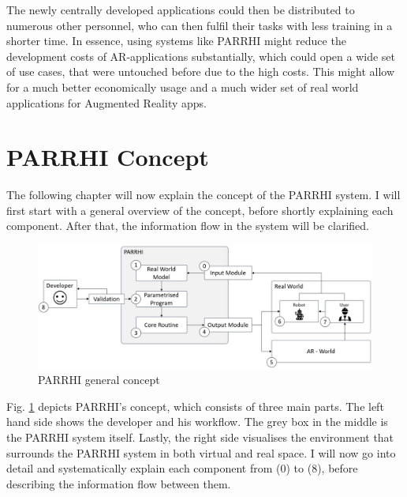 The newly centrally developed applications could then be distributed to numerous other personnel, who can then fulfil their tasks with less training in a shorter time. In essence, using systems like PARRHI might reduce the development costs of AR-applications substantially, which could open a wide set of use cases, that were untouched before due to the high costs. This might allow for a much better economically usage and a much wider set of real world applications for Augmented Reality apps. 

\clearpage
\section{PARRHI Concept}

The following chapter will now explain the concept of the PARRHI system. I will first start with a general overview of the concept, before shortly explaining each component. After that, the information flow in the system will be clarified.

\begin{figure}[h]
	\centering
	\includegraphics[width=1\textwidth]{Figures/PARRHIConcept03.jpg}
	\caption{PARRHI general concept}
	\label{Fig:PARRHIConcept}
\end{figure}

Fig. \ref{Fig:PARRHIConcept} depicts PARRHI's concept, which consists of three main parts. The left hand side shows the developer and his workflow. The grey box in the middle is the PARRHI system itself. Lastly, the right side visualises the environment that surrounds the PARRHI system in both virtual and real space. I will now go into detail and systematically explain each component from (0) to (8), before describing the information flow between them.


